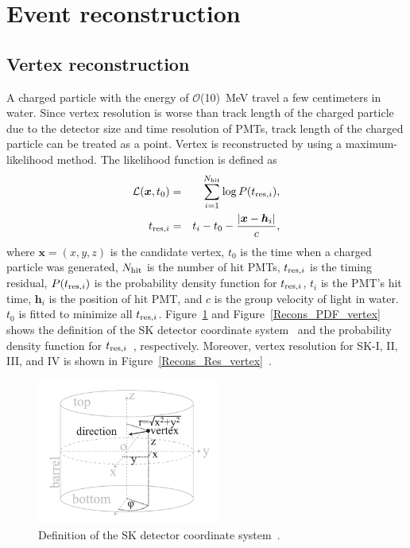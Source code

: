 

\section{Event reconstruction}\label{Section_Reconstruction}
\subsection{Vertex reconstruction}\label{Subsec_vertex_rec}
\vs\hs
A charged particle with the energy of $\mathcal{O}$(10)~MeV travel a few centimeters in water.
Since vertex resolution is worse than track length of the charged particle due to the detector size and time resolution of PMTs, track length of the charged particle can be treated as a point.
Vertex is reconstructed by using a maximum-likelihood method.
The likelihood function is defined as
\begin{eqnarray}
	\mathcal{L}(\bm{x},t_{0}) &=& \sum_{i=1}^{N_{\rm hit}} \log P(t_{{\rm res},i}), \\
	t_{{\rm res},i}           &=& t_{i} - t_{0} - {|\bm{x} - \bm{h}_{i}| \over c},
\end{eqnarray}
where $\bm{x} = (x,y,z)$ is the candidate vertex, $t_{0}$ is the time when a charged particle was generated, $N_{\rm hit}$ is the number of hit PMTs, $t_{{\rm res},i}$ is the timing residual, $P(t_{{\rm res},i})$ is the probability density function for $t_{{\rm res},i}$, $t_{i}$ is the PMT's hit time, $\bm{h}_{i}$ is the position of hit PMT, and $c$ is the group velocity of light in water.
$t_{0}$ is fitted to minimize all $t_{{\rm res},i}$.
Figure~\ref{Recons_SK_coordinate} and Figure~\ref{Recons_PDF_vertex} shows the definition of the SK detector coordinate system~\cite{2016Abe} and the probability density function for $t_{{\rm res},i}$~\cite{2023HaradaPhD}, respectively.
Moreover, vertex resolution for SK-I, II, III, and IV is shown in Figure~\ref{Recons_Res_vertex}~\cite{2016Abe}.

\begin{figure}[h]
	\centering
	\includegraphics[width=6cm]{Figures/Reconstruction/SK_coordinate}
	\caption[Definition of the SK detector coordinate system]{
	Definition of the SK detector coordinate system~\cite{2016Abe}.
	}\label{Recons_SK_coordinate}
\end{figure}

